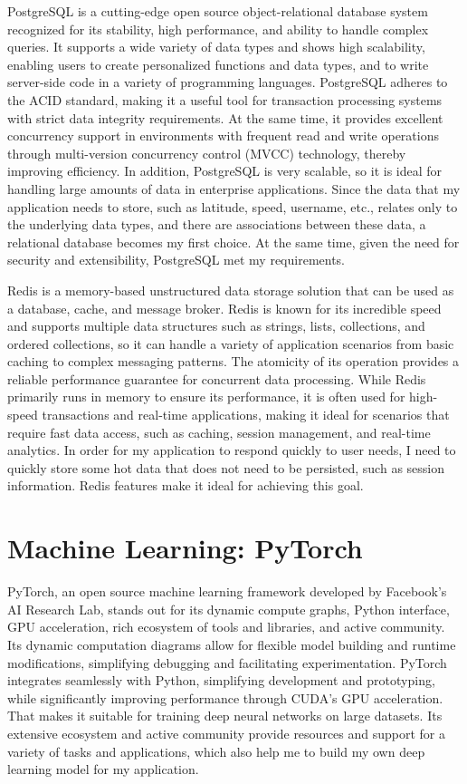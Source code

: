 \documentclass[12pt,two side]{report}
\begin{document}
PostgreSQL is a cutting-edge open source object-relational database system recognized for its stability, high performance, and ability to handle complex queries. It supports a wide variety of data types and shows high scalability, enabling users to create personalized functions and data types, and to write server-side code in a variety of programming languages. PostgreSQL adheres to the ACID standard, making it a useful tool for transaction processing systems with strict data integrity requirements. At the same time, it provides excellent concurrency support in environments with frequent read and write operations through multi-version concurrency control (MVCC) technology, thereby improving efficiency. In addition, PostgreSQL is very scalable, so it is ideal for handling large amounts of data in enterprise applications. Since the data that my application needs to store, such as latitude, speed, username, etc., relates only to the underlying data types, and there are associations between these data, a relational database becomes my first choice. At the same time, given the need for security and extensibility, PostgreSQL met my requirements.\newline

Redis is a memory-based unstructured data storage solution that can be used as a database, cache, and message broker. Redis is known for its incredible speed and supports multiple data structures such as strings, lists, collections, and ordered collections, so it can handle a variety of application scenarios from basic caching to complex messaging patterns. The atomicity of its operation provides a reliable performance guarantee for concurrent data processing. While Redis primarily runs in memory to ensure its performance, it is often used for high-speed transactions and real-time applications, making it ideal for scenarios that require fast data access, such as caching, session management, and real-time analytics. In order for my application to respond quickly to user needs, I need to quickly store some hot data that does not need to be persisted, such as session information. Redis features make it ideal for achieving this goal.

\section{Machine Learning: PyTorch\cite{pytorch}}
PyTorch, an open source machine learning framework developed by Facebook's AI Research Lab, stands out for its dynamic compute graphs, Python interface, GPU acceleration, rich ecosystem of tools and libraries, and active community. Its dynamic computation diagrams allow for flexible model building and runtime modifications, simplifying debugging and facilitating experimentation. PyTorch integrates seamlessly with Python, simplifying development and prototyping, while significantly improving performance through CUDA's GPU acceleration. That makes it suitable for training deep neural networks on large datasets. Its extensive ecosystem and active community provide resources and support for a variety of tasks and applications, which also help me to build my own deep learning model for my application.
\end{document}
